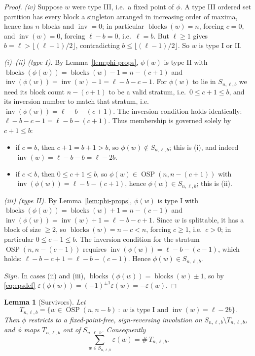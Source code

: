\documentclass[11pt]{amsart}
\newtheorem{lemma}[theorem]{Lemma}
\theoremstyle{definition}
\DeclareMathOperator{\OSP}{OSP}
\DeclareMathOperator{\inv}{inv}
\DeclareMathOperator{\blocks}{blocks}
\begin{document}
\begin{proof}
\emph{(iv)} Suppose $w$ were type III, i.e.\ a fixed point of $\phi$. A type III
ordered set partition has every block a singleton arranged in increasing order of
maxima, hence has $n$ blocks and $\inv=0$; in particular $\blocks(w)=n$, forcing
$c=0$, and $\inv(w)=0$, forcing $\ell-b=0$, i.e.\ $\ell=b$. But $\ell\ge1$ gives
$b=\ell>\lfloor(\ell-1)/2\rfloor$, contradicting $b\le\lfloor(\ell-1)/2\rfloor$.
So $w$ is type I or II.

\emph{(i)--(ii) (type I).} By Lemma~\ref{lem:phi-props}, $\phi(w)$ is type II with
$\blocks(\phi(w))=\blocks(w)-1=n-(c+1)$ and $\inv(\phi(w))=\inv(w)-1=\ell-b-c-1$.
For $\phi(w)$ to lie in $S_{n,\ell,b}$ we need its block count $n-(c+1)$ to be a
valid stratum, i.e.\ $0\le c+1\le b$, and its inversion number to match that
stratum, i.e.\ $\inv(\phi(w))=\ell-b-(c+1)$. The inversion condition holds
identically: $\ell-b-c-1=\ell-b-(c+1)$. Thus membership is governed solely by
$c+1\le b$:
\begin{itemize}
\item if $c=b$, then $c+1=b+1>b$, so $\phi(w)\notin S_{n,\ell,b}$; this is
(i), and indeed $\inv(w)=\ell-b-b=\ell-2b$.
\item if $c<b$, then $0\le c+1\le b$, so $\phi(w)\in\OSP(n,n-(c+1))$ with
$\inv(\phi(w))=\ell-b-(c+1)$, hence $\phi(w)\in S_{n,\ell,b}$; this is (ii).
\end{itemize}

\emph{(iii) (type II).} By Lemma~\ref{lem:phi-props}, $\phi(w)$ is type I with
$\blocks(\phi(w))=\blocks(w)+1=n-(c-1)$ and $\inv(\phi(w))=\inv(w)+1=\ell-b-c+1$.
Since $w$ is splittable, it has a block of size $\ge2$, so $\blocks(w)=n-c<n$,
forcing $c\ge1$, i.e.\ $c>0$; in particular $0\le c-1\le b$. The inversion
condition for the stratum $\OSP(n,n-(c-1))$ requires
$\inv(\phi(w))=\ell-b-(c-1)$, which holds: $\ell-b-c+1=\ell-b-(c-1)$. Hence
$\phi(w)\in S_{n,\ell,b}$.

\emph{Sign.} In cases (ii) and (iii), $\blocks(\phi(w))=\blocks(w)\pm1$, so by
\eqref{eq:epsdef} $\varepsilon(\phi(w))=(-1)^{\pm1}\varepsilon(w)=-\varepsilon(w)$.
\end{proof}

\begin{lemma}[Survivors]\label{lem:survivors}
Let
\begin{equation}\label{eq:Tdef}
T_{n,\ell,b}=\{w\in\OSP(n,n-b)\ :\ w\text{ is type I and }\inv(w)=\ell-2b\}.
\end{equation}
Then $\phi$ restricts to a fixed-point-free, sign-reversing involution on
$S_{n,\ell,b}\setminus T_{n,\ell,b}$, and $\phi$ maps $T_{n,\ell,b}$ out of
$S_{n,\ell,b}$. Consequently
\begin{equation}\label{eq:signed-sum}
\sum_{w\in S_{n,\ell,b}}\varepsilon(w) = \#\,T_{n,\ell,b}.
\end{equation}
\end{lemma}
\end{document}

